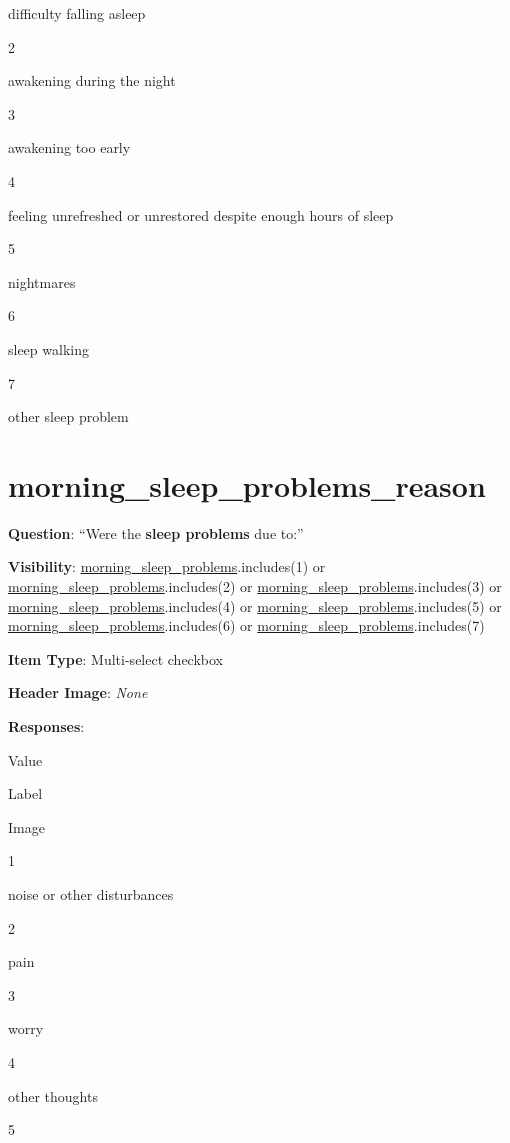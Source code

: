 \documentclass[]{book}
\begin{document}
difficulty falling asleep

2

awakening during the night

3

awakening too early

4

feeling unrefreshed or unrestored despite enough hours of sleep

5

nightmares

6

sleep walking

7

other sleep problem

\hypertarget{morning_sleep_problems_reason}{%
\section{morning\_sleep\_problems\_reason}\label{morning_sleep_problems_reason}}

\textbf{Question}: ``Were the \textbf{sleep problems} due to:''

\textbf{Visibility}: \protect\hyperlink{morning_sleep_problems}{morning\_sleep\_problems}.includes(1) or \protect\hyperlink{morning_sleep_problems}{morning\_sleep\_problems}.includes(2) or \protect\hyperlink{morning_sleep_problems}{morning\_sleep\_problems}.includes(3) or \protect\hyperlink{morning_sleep_problems}{morning\_sleep\_problems}.includes(4) or \protect\hyperlink{morning_sleep_problems}{morning\_sleep\_problems}.includes(5) or \protect\hyperlink{morning_sleep_problems}{morning\_sleep\_problems}.includes(6) or \protect\hyperlink{morning_sleep_problems}{morning\_sleep\_problems}.includes(7)

\textbf{Item Type}: Multi-select checkbox

\textbf{Header Image}: \emph{None}

\textbf{Responses}:

Value

Label

Image

1

noise or other disturbances

2

pain

3

worry

4

other thoughts

5
\end{document}
